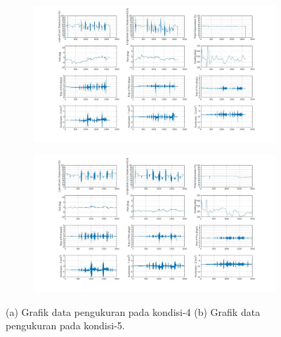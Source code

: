 \begin{figure}[H]
	\begin{subfigure}{0.49\textwidth}
		\centering
		\includegraphics[width=\linewidth]{gambar/Condition_4.jpg}
		\caption{}
		\label{fig:condition_4}
	\end{subfigure}
	\centering
	\begin{subfigure}{0.49\textwidth}
		\centering
		\includegraphics[width=\linewidth]{gambar/Condition_5.jpg}
		\caption{}
		\label{fig:condition_5}
	\end{subfigure}
	\caption{(a) Grafik data pengukuran pada kondisi-4 (b) Grafik data pengukuran pada kondisi-5.}
\end{figure}

